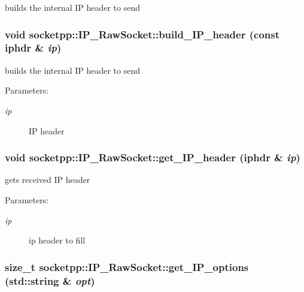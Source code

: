 builds the internal IP header to send 

\hypertarget{classsocketpp_1_1IP__RawSocket_f93c51a7a8284fe9d2b24019b13a5803}{
\subsubsection[{build\_\-IP\_\-header}]{\setlength{\rightskip}{0pt plus 5cm}void socketpp::IP\_\-RawSocket::build\_\-IP\_\-header (const iphdr \& {\em ip})}}
\label{classsocketpp_1_1IP__RawSocket_f93c51a7a8284fe9d2b24019b13a5803}


builds the internal IP header to send 

\begin{Desc}
\item[Parameters:]
\begin{description}
\item[{\em ip}]IP header \end{description}
\end{Desc}
\hypertarget{classsocketpp_1_1IP__RawSocket_e477f483d5a8baa76c60399d0809d043}{
\subsubsection[{get\_\-IP\_\-header}]{\setlength{\rightskip}{0pt plus 5cm}void socketpp::IP\_\-RawSocket::get\_\-IP\_\-header (iphdr \& {\em ip})}}
\label{classsocketpp_1_1IP__RawSocket_e477f483d5a8baa76c60399d0809d043}


gets received IP header 

\begin{Desc}
\item[Parameters:]
\begin{description}
\item[{\em ip}]ip header to fill \end{description}
\end{Desc}
\hypertarget{classsocketpp_1_1IP__RawSocket_c9bec0c1db60871bb1cb5560b97e02ed}{
\subsubsection[{get\_\-IP\_\-options}]{\setlength{\rightskip}{0pt plus 5cm}size\_\-t socketpp::IP\_\-RawSocket::get\_\-IP\_\-options (std::string \& {\em opt})}}
\label{classsocketpp_1_1IP__RawSocket_c9bec0c1db60871bb1cb5560b97e02ed}


